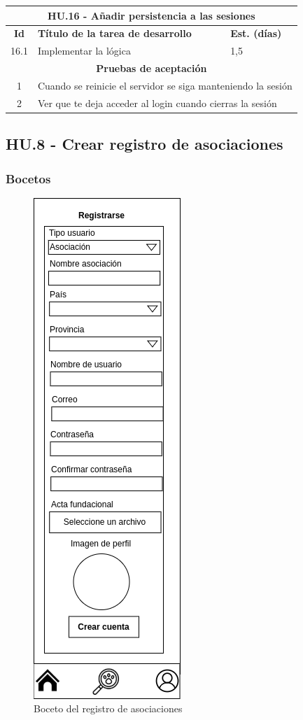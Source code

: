 \begin{table}[H]
	\centering
\begin{tabular}{|c|p{9.5cm}|p{1cm}|}
	\hline
	\multicolumn{3}{|c|}{\textbf{HU.16 - Añadir persistencia a las sesiones}} \\
	\hline
	\textbf{Id} & \textbf{Título de la tarea de desarrollo} & \textbf{Est. (días)} \\
	\hline
	16.1 &  Implementar la lógica & 1,5 \\ \hline
	\multicolumn{3}{|c|}{\textbf{Pruebas de aceptación}} \\ \hline
	1 & \multicolumn{2}{|p{12cm}|}{Cuando se reinicie el servidor se siga manteniendo la sesión} \\ \hline
	2 & \multicolumn{2}{|p{12cm}|}{Ver que te deja acceder al login cuando cierras la sesión} \\ \hline
	
\end{tabular}
\end{table}

\subsection{HU.8 - Crear registro de asociaciones}

\subsubsection{Bocetos}

\begin{figure}[H]
	\centering
	\includegraphics[width=0.31\linewidth]{sprint 3//hu8/registro_asociaciones.png}
	\caption{Boceto del registro de asociaciones}
	\label{fig:boceto_regAso}
\end{figure}

